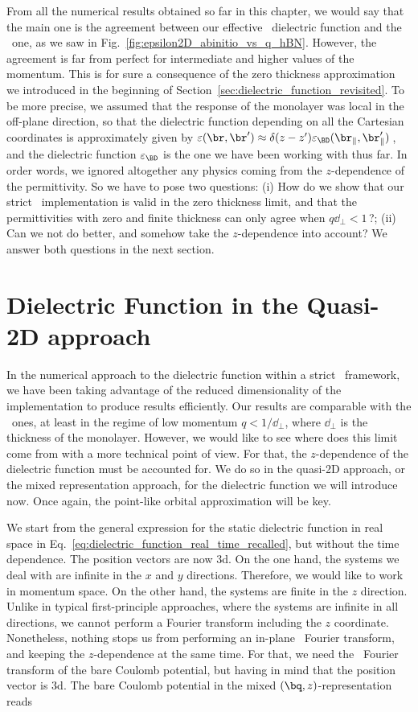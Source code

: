 From all the numerical results obtained so far in this chapter, we would say that the main one is the agreement between our effective \bd~dielectric function and the \abinit~one, as we saw in Fig.~\ref{fig:epsilon2D_abinitio_vs_q_hBN}.
However, the agreement is far from perfect for intermediate and higher values of the momentum.
This is for sure a consequence of the zero thickness approximation we introduced in the beginning of Section~\ref{sec:dielectric_function_revisited}.
To be more precise, we assumed that the response of the monolayer was local in the off-plane direction, so that the dielectric function depending on all the Cartesian coordinates is approximately given by $\varepsilon(\br,\br') \approx \delta(z-z') \varepsilon_{\BD}(\br_{\parallel},\br'_{\parallel})$\,, and the dielectric function $\varepsilon_{\BD}$ is the one we have been working with thus far.
In order words, we ignored altogether any physics coming from the $z$-dependence of the permittivity.
So we have to pose two questions: (i) How do we show that our strict \bd~implementation is valid in the zero thickness limit, and that the permittivities with zero and finite thickness can only agree when $q \dd_{\perp} < 1$\,?; (ii) Can we not do better, and somehow take the $z$-dependence into account?
We answer both questions in the next section.

\section{Dielectric Function in the Quasi-2D approach}
\label{sec:quasi_2D}

In the numerical approach to the dielectric function within a strict \bd~framework, we have been taking advantage of the reduced dimensionality of the implementation to produce results efficiently.
Our results are comparable with the \abinit~ones, at least in the regime of low momentum $q < 1/\dd_{\perp}$, where $\dd_{\perp}$ is the thickness of the monolayer.
However, we would like to see where does this limit come from with a more technical point of view.
For that, the $z$-dependence of the dielectric function must be accounted for.
We do so in the quasi-2D approach, or the mixed representation approach, for the dielectric function we will introduce now.
Once again, the point-like orbital approximation will be key.

We start from the general expression for the static dielectric function in real space in Eq.~\eqref{eq:dielectric_function_real_time_recalled}, but without the time dependence.
The position vectors are now \gls{3d}.
On the one hand, the systems we deal with are infinite in the $x$ and $y$ directions.
Therefore, we would like to work in momentum space.
On the other hand, the systems are finite in the $z$ direction.
Unlike in typical first-principle approaches, where the systems are infinite in all directions, we cannot perform a Fourier transform including the $z$ coordinate.
Nonetheless, nothing stops us from performing an in-plane \bd~Fourier transform, and keeping the $z$-dependence at the same time.
For that, we need the \bd~Fourier transform of the bare Coulomb potential, but having in mind that the position vector is \gls{3d}.
The bare Coulomb potential in the mixed $(\bq,z)$-representation reads


